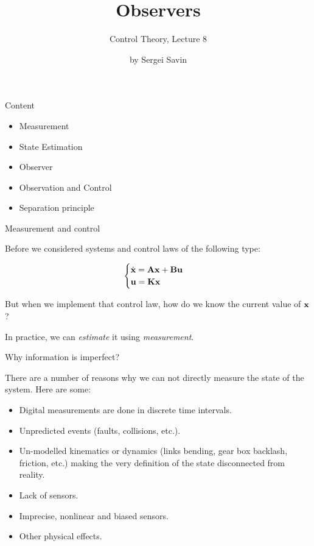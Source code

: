 \documentclass{beamer}
\title{Observers}
\subtitle{Control Theory, Lecture 8}
\author{by Sergei Savin}
\date{\mydate}
\begin{document}
\maketitle



\begin{frame}{Content}
\begin{itemize}
\item Measurement
\item State Estimation
\item Observer
\item Observation and Control
\item Separation principle
\end{itemize}
\end{frame}




\begin{frame}{Measurement and control}
\begin{flushleft}

Before we considered systems and control laws of the following type:

\begin{equation}
\begin{cases}
\dot {\mathbf{x}} = \mathbf{A} \mathbf{x} + \mathbf{B} \mathbf{u}\\
\mathbf{u} = \mathbf{K} \mathbf{x}
\end{cases}
\end{equation}

But when we implement that control law, how do we know the current value of $\mathbf{x}$?

\bigskip

In practice, we can \emph{estimate} it using \emph{measurement}.

\end{flushleft}
\end{frame}

\begin{frame}{Why information is imperfect?}
\begin{flushleft}

There are a number of reasons why we can not directly measure the state of the system. Here are some:

\begin{itemize}
\item Digital measurements are done in discrete time intervals.
\item Unpredicted events (faults, collisions, etc.).
\item Un-modelled kinematics or dynamics (links bending, gear box backlash,  friction, etc.) making the very definition of the state disconnected from reality.
\item Lack of sensors.
\item Imprecise, nonlinear and biased sensors.
\item Other physical effects.
\end{itemize}

\end{flushleft}
\end{frame}
\end{document}
